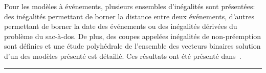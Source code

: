 \begin{center}
\begin{minipage}{\textwidth}
{      Pour les modèles à événements, plusieurs ensembles d'inégalités
      sont présentées: des inégalités permettant de borner la distance
      entre deux événements, d'autres permettant de borner la date des
      événements ou des inégalités dérivées du problème du
      sac-à-dos. De plus, des coupes appelées inégalités de
      non-préemption sont définies et une étude polyhédrale de
      l'ensemble des vecteurs binaires solution d'un des modèles
      présenté est détaillé. Ces résultats ont été présenté
      dans~\cite{Nattaf_ROADEF16,Nattaf_ECCO16}. }
    \vspace{0.5cm}
    \hrule
  \end{minipage}
\end{center}

 
